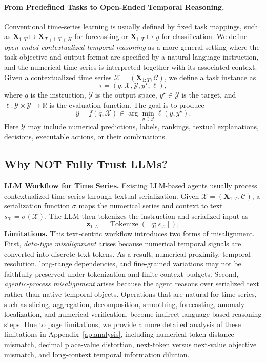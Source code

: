 \paragraph{From Predefined Tasks to Open-Ended Temporal Reasoning.} Conventional time-series learning is usually defined by fixed task mappings, such as $\mathbf{X}_{1:T} \mapsto \mathbf{X}_{T+1:T+H}$ for forecasting or $\mathbf{X}_{1:T} \mapsto y$ for classification. We define \textit{open-ended contextualized temporal reasoning} as a more general setting where the task objective and output format are specified by a natural-language instruction, and the numerical time series is interpreted together with its associated context. Given a contextualized time series
$\mathcal{X}=(\mathbf{X}_{1:T},\mathcal{C})$, we define a task instance as
\begin{equation}
    \tau = (q, \mathcal{X}, \mathcal{Y}, y^\star, \ell),
\end{equation}
where $q$ is the instruction, $\mathcal{Y}$ is the output space, $y^\star \in
\mathcal{Y}$ is the target, and $\ell:\mathcal{Y}\times\mathcal{Y}\to\mathbb{R}$
is the evaluation function. The goal is to produce
\begin{equation}
    \hat{y}=f(q,\mathcal{X})\in\arg\min_{y\in\mathcal{Y}}\ell(y,y^\star).
\end{equation}
Here $\mathcal{Y}$ may include numerical predictions, labels, rankings, textual
explanations, decisions, executable actions, or their combinations. 



\subsection{Why NOT Fully Trust LLMs?}
\textbf{LLM Workflow for Time Series.}
Existing LLM-based agents usually process contextualized time series through
textual serialization. Given $\mathcal{X}=(\mathbf{X}_{1:T},\mathcal{C})$, a
serialization function $\sigma$ maps the numerical series and context to text
$s_\mathcal{X}=\sigma(\mathcal{X})$. The LLM then tokenizes the instruction and serialized input as
\begin{equation}
    \mathbf{z}_{1:L}=\operatorname{Tokenize}([q;s_{\mathcal{X}}]),
\end{equation}
\textbf{Limitations.}
This text-centric workflow introduces two forms of misalignment. First,
\textit{data-type misalignment} arises because numerical temporal signals are
converted into discrete text tokens. As a result, numerical proximity, temporal
resolution, long-range dependencies, and fine-grained variations may not be
faithfully preserved under tokenization and finite context budgets. Second,
\textit{agentic-process misalignment} arises because the agent reasons over
serialized text rather than native temporal objects. Operations that are natural
for time series, such as slicing, aggregation, decomposition, smoothing,
forecasting, anomaly localization, and numerical verification, become indirect
language-based reasoning steps. Due to page limitations, we provide a more detailed analysis of these
limitations in Appendix~\ref{ap:analysis}, including numerical-token
distance mismatch, decimal place-value distortion, next-token versus next-value
objective mismatch, and long-context temporal information dilution. 